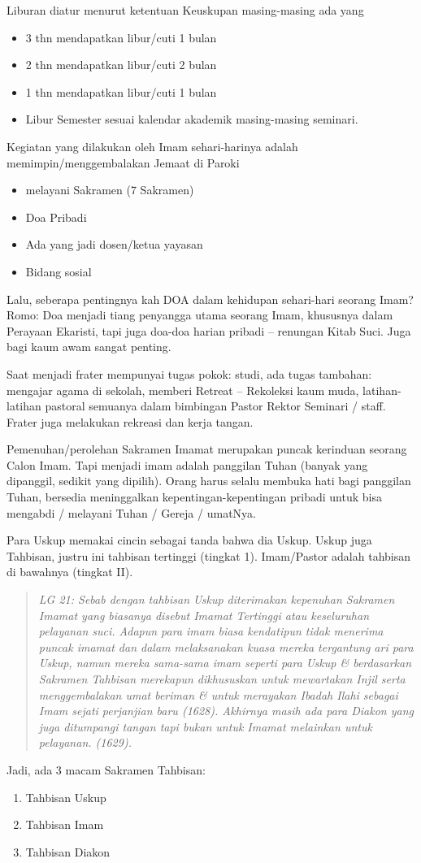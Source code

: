 Liburan diatur menurut ketentuan Keuskupan masing-masing ada yang
\begin{itemize}
\item 3 thn mendapatkan libur/cuti 1 bulan
\item 2 thn mendapatkan libur/cuti 2 bulan
\item 1 thn mendapatkan libur/cuti 1 bulan
\item Libur Semester sesuai kalendar akademik masing-masing seminari.
\end{itemize}

Kegiatan yang dilakukan oleh Imam sehari-harinya adalah
memimpin/menggembalakan Jemaat di Paroki

\begin{itemize}
\item melayani Sakramen (7 Sakramen)
\item Doa Pribadi
\item Ada yang jadi dosen/ketua yayasan
\item Bidang sosial
\end{itemize}

Lalu, seberapa pentingnya kah DOA dalam kehidupan sehari-hari seorang Imam?
Romo: Doa menjadi tiang penyangga utama seorang Imam, khususnya dalam Perayaan Ekaristi, tapi juga doa-doa harian pribadi – renungan Kitab Suci. Juga bagi kaum awam sangat penting.

Saat menjadi frater mempunyai tugas pokok: studi, ada tugas tambahan: mengajar agama di sekolah, memberi Retreat -- Rekoleksi kaum muda, latihan-latihan pastoral  semuanya dalam bimbingan Pastor Rektor Seminari / staff.
Frater juga melakukan rekreasi dan kerja tangan.

Pemenuhan/perolehan Sakramen Imamat merupakan puncak kerinduan seorang Calon Imam. Tapi menjadi imam adalah panggilan Tuhan (banyak yang dipanggil, sedikit yang dipilih). Orang harus selalu membuka hati bagi panggilan Tuhan, bersedia meninggalkan kepentingan-kepentingan pribadi untuk bisa mengabdi / melayani Tuhan / Gereja / umatNya.

Para Uskup memakai cincin sebagai tanda bahwa dia Uskup. Uskup juga Tahbisan, justru ini tahbisan tertinggi (tingkat 1). Imam/Pastor adalah tahbisan di bawahnya (tingkat II). 

\begin{quote}\emph{
LG 21: Sebab dengan tahbisan Uskup diterimakan kepenuhan Sakramen Imamat yang biasanya disebut Imamat Tertinggi atau keseluruhan pelayanan suci. Adapun para imam biasa kendatipun tidak menerima puncak imamat dan dalam melaksanakan kuasa mereka tergantung ari para Uskup, namun mereka sama-sama imam seperti para Uskup \& berdasarkan Sakramen Tahbisan merekapun dikhususkan untuk mewartakan Injil serta menggembalakan umat beriman \& untuk merayakan Ibadah Ilahi sebagai Imam sejati perjanjian baru (1628). Akhirnya masih ada para Diakon yang juga ditumpangi tangan tapi bukan untuk Imamat melainkan untuk pelayanan. (1629).}
\end{quote}

Jadi, ada 3 macam Sakramen Tahbisan:
\begin{enumerate}
\item Tahbisan Uskup
\item Tahbisan Imam
\item Tahbisan Diakon
\end{enumerate}

